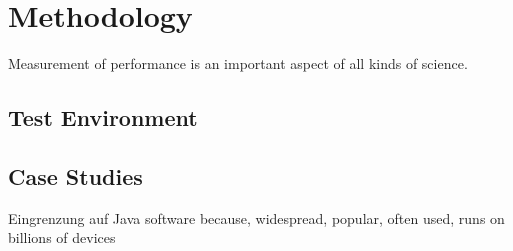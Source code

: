 \chapter{Methodology}
\label{chap:p_measurement}

 Measurement of performance is an important aspect of all kinds of science. 


\section{Test Environment}
\label{test_env}


\section{Case Studies}
\label{case_studies}

Eingrenzung auf Java software because, widespread, popular, often used, runs on billions of devices

% 


